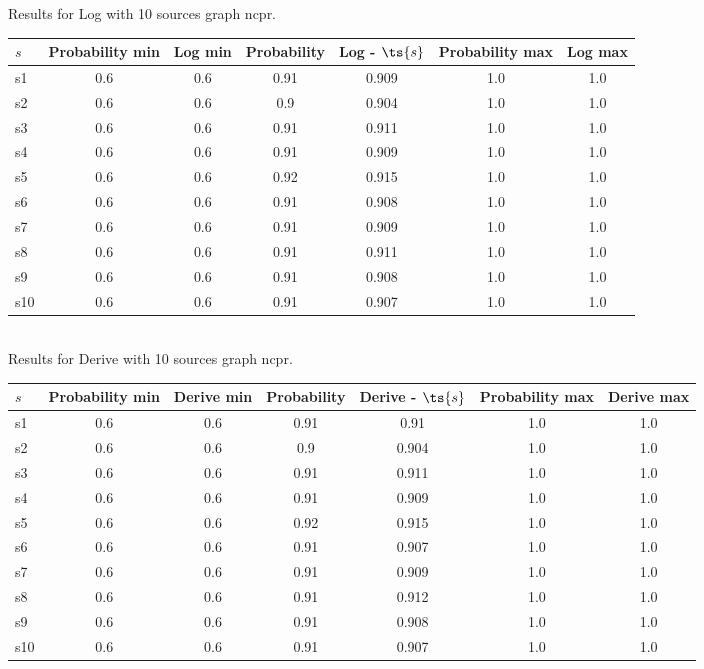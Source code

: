 \documentclass{article}
\begin{document}
\noindent Results for Log with 10 sources graph ncpr.

\noindent\begin{tabular}{|l|c|c|c|c|c|c|}
\hline
$s$& Probability min & Log min & Probability & Log - $\ts{s}$ & Probability max & Log max\\
\hline
s1 &0.6 & 0.6 & 0.91 & 0.909 & 1.0 & 1.0\\
\hline
s2 &0.6 & 0.6 & 0.9 & 0.904 & 1.0 & 1.0\\
\hline
s3 &0.6 & 0.6 & 0.91 & 0.911 & 1.0 & 1.0\\
\hline
s4 &0.6 & 0.6 & 0.91 & 0.909 & 1.0 & 1.0\\
\hline
s5 &0.6 & 0.6 & 0.92 & 0.915 & 1.0 & 1.0\\
\hline
s6 &0.6 & 0.6 & 0.91 & 0.908 & 1.0 & 1.0\\
\hline
s7 &0.6 & 0.6 & 0.91 & 0.909 & 1.0 & 1.0\\
\hline
s8 &0.6 & 0.6 & 0.91 & 0.911 & 1.0 & 1.0\\
\hline
s9 &0.6 & 0.6 & 0.91 & 0.908 & 1.0 & 1.0\\
\hline
s10 &0.6 & 0.6 & 0.91 & 0.907 & 1.0 & 1.0\\
\hline
\end{tabular}\\

\noindent Results for Derive with 10 sources graph ncpr.

\noindent\begin{tabular}{|l|c|c|c|c|c|c|}
\hline
$s$& Probability min & Derive min & Probability & Derive - $\ts{s}$ & Probability max & Derive max\\
\hline
s1 &0.6 & 0.6 & 0.91 & 0.91 & 1.0 & 1.0\\
\hline
s2 &0.6 & 0.6 & 0.9 & 0.904 & 1.0 & 1.0\\
\hline
s3 &0.6 & 0.6 & 0.91 & 0.911 & 1.0 & 1.0\\
\hline
s4 &0.6 & 0.6 & 0.91 & 0.909 & 1.0 & 1.0\\
\hline
s5 &0.6 & 0.6 & 0.92 & 0.915 & 1.0 & 1.0\\
\hline
s6 &0.6 & 0.6 & 0.91 & 0.907 & 1.0 & 1.0\\
\hline
s7 &0.6 & 0.6 & 0.91 & 0.909 & 1.0 & 1.0\\
\hline
s8 &0.6 & 0.6 & 0.91 & 0.912 & 1.0 & 1.0\\
\hline
s9 &0.6 & 0.6 & 0.91 & 0.908 & 1.0 & 1.0\\
\hline
s10 &0.6 & 0.6 & 0.91 & 0.907 & 1.0 & 1.0\\
\hline
\end{tabular}\\
\end{document}
